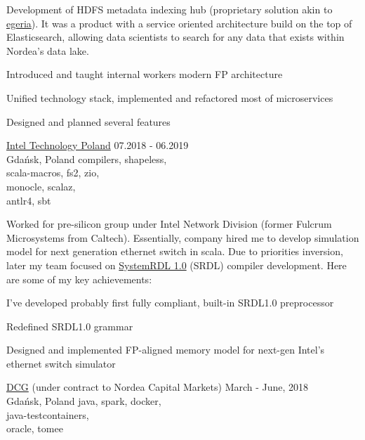 \documentclass[a4paper,11pt]{cv4tw}%
\begin{document}
      {Development of HDFS metadata indexing hub (proprietary solution akin to \href{https://egeria.odpi.org}{egeria}).
        It was a product with a service oriented architecture build on the top of
        Elasticsearch, allowing data scientists to search for any data that exists
        within Nordea's data lake.
        \begin{missions}
        \item Introduced and taught internal workers modern FP architecture
        \item Unified technology stack, implemented and refactored most of microservices
        \item Designed and planned several features
        \end{missions}
      }
      {\href{https://www.intel.com/content/www/us/en/jobs/locations/poland.html}{Intel Technology Poland}}
      {07.2018 - 06.2019\\Gdańsk, Poland}
      {compilers, shapeless,\\scala-macros, fs2, zio,\\monocle, scalaz,\\antlr4, sbt}
      {Worked for pre-silicon group under Intel Network Division (former Fulcrum Microsystems from Caltech).
        Essentially, company hired me to develop simulation model for next generation ethernet switch in scala.
        Due to priorities inversion, later my team focused on
        \href{https://www.accellera.org/downloads/standards/systemrdl}{SystemRDL 1.0} (SRDL) compiler development.
        Here are some of my key achievements:
        \begin{missions}
        \item I've developed probably first fully compliant, built-in SRDL1.0 preprocessor
        \item Redefined SRDL1.0 grammar
        \item Designed and implemented FP-aligned memory model for next-gen Intel's ethernet switch simulator
        \end{missions}
      }
      {\href{https://diversecg.pl/}{DCG} (under contract to Nordea Capital Markets)}
      {March - June, 2018\\Gdańsk, Poland}
      {java, spark, docker,\\java-testcontainers,\\oracle, tomee}
\end{document}
